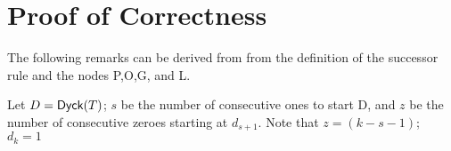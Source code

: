 
\section{Proof of Correctness} \label{sec:otree-proof}

The following remarks can be derived from from the definition of the successor rule and the nodes P,O,G, and L.


Let $D=\mathsf{Dyck}{(T)}$; $s$ be the number of consecutive ones to start D, and $z$ be the number of consecutive zeroes starting at $d_{s+1}$.  Note that $z=(k-s-1)$; $d_{k}=1$

